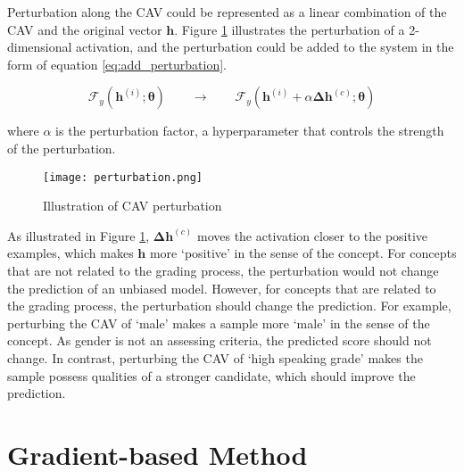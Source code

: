 Perturbation along the CAV could be represented as a linear combination of the CAV and the original vector $\boldsymbol{h}$. Figure \ref{fig:perturbation} illustrates the perturbation of a 2-dimensional activation, and the perturbation could be added to the system in the form of equation \ref{eq:add_perturbation}.

\begin{equation} \label{eq:add_perturbation}
    \mathcal{F}_{y}(\boldsymbol{h}^{(i)}; \boldsymbol{\theta}) \qquad \rightarrow \qquad \mathcal{F}_{y}(\boldsymbol{h}^{(i)} + \alpha \boldsymbol{\Delta h}^{(c)}; \boldsymbol{\theta})
\end{equation}

where $\alpha$ is the perturbation factor, a hyperparameter that controls the strength of the perturbation.

\begin{figure}[H]
    \centering
    \texttt{[image: perturbation.png]}
    \caption{Illustration of CAV perturbation}
    \label{fig:perturbation}
\end{figure}

As illustrated in Figure \ref{fig:perturbation}, $\boldsymbol{\Delta h}^{(c)}$ moves the activation closer to the positive examples, which makes $\boldsymbol{h}$ more `positive' in the sense of the concept. For concepts that are not related to the grading process, the perturbation would not change the prediction of an unbiased model. However, for concepts that are related to the grading process, the perturbation should change the prediction. For example, perturbing the CAV of `male' makes a sample more `male' in the sense of the concept. As gender is not an assessing criteria, the predicted score should not change. In contrast, perturbing the CAV of `high speaking grade' makes the sample possess qualities of a stronger candidate, which should improve the prediction.

\section{Gradient-based Method} \label{sec:gradient}


